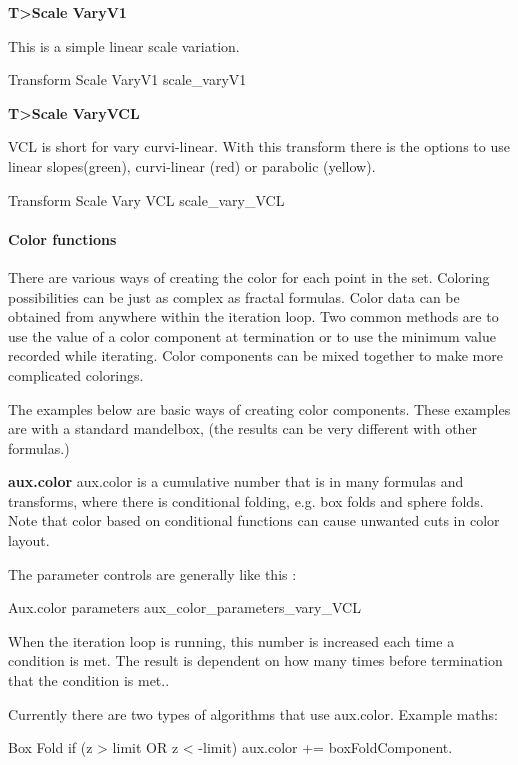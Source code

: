 \textbf{T>Scale VaryV1}

This is a simple linear scale variation.

{Transform Scale VaryV1}
{scale_varyV1}

\textbf{T>Scale VaryVCL}

VCL is short for vary curvi-linear. With this transform there is the options to use linear slopes(green), curvi-linear (red) or parabolic (yellow).

{Transform Scale Vary VCL}
{scale_vary_VCL}




\paragraph{Color functions}

There are various ways of creating the color for each point in the set. Coloring possibilities  can be just as complex as fractal formulas. Color data can be obtained from anywhere within the iteration loop. Two common methods are to use the value of a color component at termination or to use the minimum value recorded while iterating. Color components can be mixed together to make more complicated colorings.

The examples below are basic ways of creating color components. These examples are with a standard  mandelbox, (the results can be very different with other formulas.)


\textbf{aux.color}
aux.color is a cumulative number that is in many formulas and transforms,  where there is conditional folding, e.g. box folds and sphere folds. Note that color based on conditional functions can cause unwanted cuts in color layout.

The parameter controls are generally like this :

{Aux.color parameters}
{aux_color_parameters_vary_VCL}

When the iteration loop is running, this number is increased each time a condition is met.  The result is dependent on how many times before termination  that the condition is met..

Currently there are two types of algorithms that use aux.color.  Example maths:

Box Fold
if  (z  >  limit  OR  z  <   -limit)   aux.color +=  boxFoldComponent.

